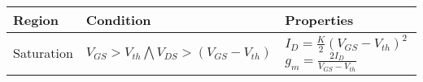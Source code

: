 \documentclass{article}
\begin{document}
\begin{tabu}{  l  X  X  }
	\hline
	Region & Condition & Properties \\ \hline
	Saturation & \(V_{GS} > V_{th} \bigwedge V_{DS} > (V_{GS}-V_{th})\) &
	 \\ \hline
\end{tabu}
\end{document}
